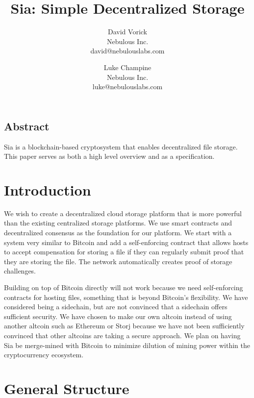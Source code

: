 \documentclass[twocolumn]{article}
\begin{document}
\frenchspacing

\title{Sia: Simple Decentralized Storage}

\author{
{\rm David Vorick}\\
Nebulous Inc.\\
david@nebulouslabs.com
\and
{\rm Luke Champine}\\
Nebulous Inc.\\
luke@nebulouslabs.com
}

\maketitle

\subsection*{Abstract}
Sia is a blockchain-based cryptosystem that enables decentralized file storage.
This paper serves as both a high level overview and as a specification.

\section{Introduction}
We wish to create a decentralized cloud storage platform that is more powerful than the existing centralized storage platforms.
We use smart contracts and decentralized consensus as the foundation for our platform.
We start with a system very similar to Bitcoin and add a self-enforcing contract that allows hosts to accept compensation for storing a file if they can regularly submit proof that they are storing the file.
The network automatically creates proof of storage challenges.

Building on top of Bitcoin directly will not work because we need self-enforcing contracts for hosting files, something that is beyond Bitcoin's flexibility.
We have considered being a sidechain, but are not convinced that a sidechain offers sufficient security.
We have chosen to make our own altcoin instead of using another altcoin such as Ethereum or Storj because we have not been sufficiently convinced that other altcoins are taking a secure approach.
We plan on having Sia be merge-mined with Bitcoin to minimize dilution of mining power within the cryptocurrency ecosystem.

\section{General Structure}
\end{document}

